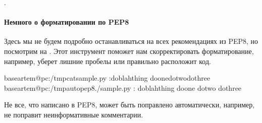 \documentclass[letterpaper,10pt,russian]{sphinxmanual}
\begin{document}
\sphinxAtStartPar
{}.


\paragraph{Немного о форматировании по PEP8}
\label{\detokenize{educational_materials/packaging/content:pep8}}
\sphinxAtStartPar
Здесь мы не будем подробно останавливаться на всех рекомендациях из PEP8, но посмотрим на . Этот инструмент поможет нам скорректировать форматирование, например, уберет лишние пробелы или правильно расположит код.

\begin{sphinxVerbatim}[commandchars=\\\{\}]
baseartem@pc:\PYGZti{}/tmp\PYGZdl{}catsample.py
:do\PYGZus{}blah\PYGZus{}thing
do\PYGZus{}onedo\PYGZus{}twodo\PYGZus{}three
baseartem@pc:\PYGZti{}/tmp\PYGZdl{}autopep8./sample.py
:
do\PYGZus{}blah\PYGZus{}thing
do\PYGZus{}one
do\PYGZus{}two
do\PYGZus{}three
\end{sphinxVerbatim}

\sphinxAtStartPar
Не все, что написано в PEP8, может быть поправлено автоматически, например,  не поправит неинформативные комментарии.

\begin{sphinxVerbatim}[commandchars=\\\{\}]
                     

                     
\end{sphinxVerbatim}
\end{document}
